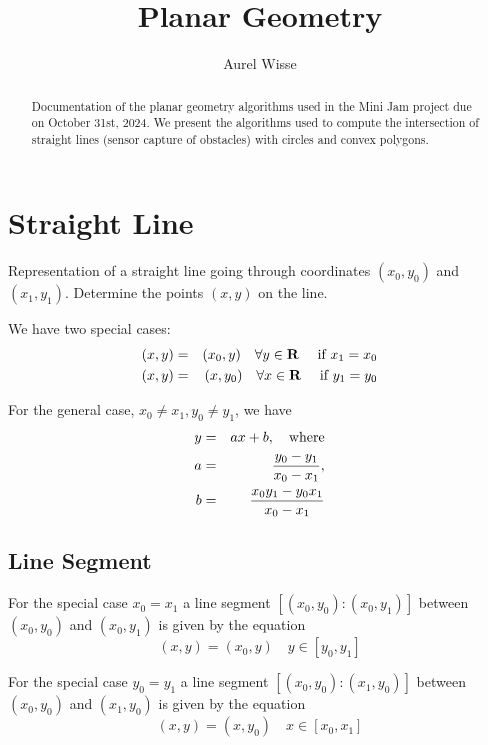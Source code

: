\documentclass[11pt]{article}
\newcommand{\Rb}{{\bf{R}}}
\begin{document}
%
%
\title{Planar Geometry}
\author{Aurel Wisse}
\maketitle
%
%
\begin{abstract}
Documentation of the planar geometry algorithms used in the
Mini Jam project due on October 31st, 2024. We present the algorithms used to
compute the intersection of straight lines (sensor capture of obstacles) with
circles and convex polygons.
\end{abstract}

%
\section{Straight Line}
\label{sec-straight-line}

Representation of a straight line going through
coordinates $(x_0, y_0)$ and $(x_1, y_1)$. Determine the points $(x, y)$ on the
line.

We have two special cases: 
\begin{eqnarray}
    (x, y) &=& (x_0, y)\quad\forall y\in\Rb\quad \text{ if } x_1 = x_0 \\
    (x, y) &=& (x, y_0)\quad\forall x\in\Rb\quad \text{ if } y_1 = y_0
\end{eqnarray}

For the general case, $x_0 \neq x_1, y_0 \neq y_1$, we have
\begin{eqnarray}
    y &=& ax+b,\quad \text{where} \label{eq-line-general}\\
    a &=& \frac{y_0 - y_1}{x_0 - x_1}, \notag \\
    b &=& \frac{x_0 y_1 - y_0 x_1}{x_0 - x_1} \notag
\end{eqnarray}

\subsection{Line Segment}
\label{sec-line-segment}

For the special case $x_0 = x_1$ a line segment $[(x_0, y_0):(x_0, y_1)]$ 
between $(x_0, y_0)$ and $(x_0, y_1)$ is given by the equation
\begin{equation}
    (x, y) = (x_0, y)\quad y\in [y_0, y_1]
\end{equation}

For the special case $y_0 = y_1$ a line segment $[(x_0, y_0):(x_1, y_0)]$ 
between $(x_0, y_0)$ and $(x_1, y_0)$ is given by the equation
\begin{equation}
    (x, y) = (x, y_0)\quad x\in [x_0, x_1]
\end{equation}
\end{document}
